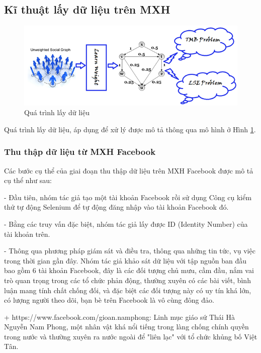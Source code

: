 	\subsection{Kĩ thuật lấy dữ liệu trên MXH}
	\begin{center}
		\begin{figure}[htp]
			\begin{center}
				\includegraphics [scale=.5]{picture/Hinh3_1}
			\end{center}
			\caption{Quá trình lấy dữ liệu}
			\label{refhinh3_1}
		\end{figure}
	\end{center}
	Quá trình lấy dữ liệu, áp dụng để xử lý được mô tả thông qua mô hình ở Hình \ref {refhinh3_1}.
		\subsubsection{Thu thập dữ liệu từ MXH Facebook}
		Các bước cụ thể của giai đoạn thu thập dữ liệu trên MXH Facebook được mô tả cụ thể như sau:
		
		- Đầu tiên, nhóm tác giả tạo một tài khoản Facebook rồi sử dụng Công cụ kiểm thử tự động Selenium để tự động đăng nhập vào tài khoản Facebook đó.
		
		- Bằng các truy vấn đặc biệt, nhóm tác giả lấy được ID (Identity Number) của tài khoản trên.
		
		- Thông qua phương pháp giám sát và điều tra, thông qua những tin tức, vụ việc trong thời gian gần đây. Nhóm tác giả khảo sát dữ liệu với tập nguồn ban đầu bao gồm 6 tài khoản Facebook, đây là các đối tượng chủ mưu, cầm đầu, nắm vai trò quan trọng trong các tổ chức phản động, thường xuyên có các bài viết, bình luận mang tính chất chống đối, và đặc biệt các đối tượng này có uy tín khá lớn, có lượng người theo dõi, bạn bè trên Facebook là vô cùng đông đảo.
		
		+	https://www.facebook.com/gioan.namphong: Linh mục giáo sứ Thái Hà Nguyễn Nam Phong, một nhân vật khá nổi tiếng trong làng chống chính quyền trong nước và thường xuyên ra nước ngoài để "liên lạc" với tổ chức khủng bố Việt Tân.
		
